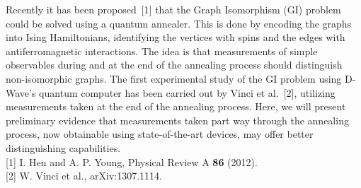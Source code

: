 Recently it has been proposed~[1] that the Graph Isomorphism (GI) problem could
be solved using a quantum annealer. This is done by encoding the graphs into
Ising Hamiltonians, identifying the vertices with spins and the edges with
antiferromagnetic interactions. The idea is that measurements of simple
observables during and at the end of the annealing process should distinguish
non-isomorphic graphs. The first experimental study of the GI problem using
D-Wave's quantum computer has been carried out by Vinci et al.~[2], utilizing
measurements taken at the end of the annealing process. Here, we will present
preliminary evidence that measurements taken part way through the annealing
process, now obtainable using state-of-the-art devices, may offer better
distinguishing capabilities.\\[4pt]
[1] I. Hen and A. P. Young, Physical Review A \textbf{86} (2012).\\[0pt]
[2] W. Vinci et al., arXiv:1307.1114.
